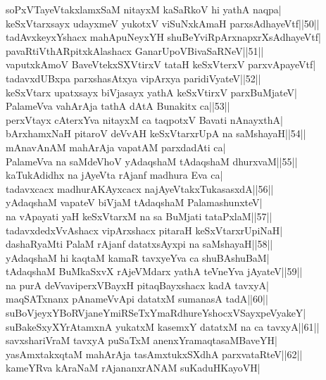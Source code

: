 \documentclass{article}
\begin{document}
soPxVTayeVtakxlamxSaM nitayxM kaSaRkoV hi yathA naqpa|\\
keSxVtarxsayx udayxmeV yukotxV viSuNxkAmaH parxsAdhayeVtf||50||\\
tadAvxkeyxYshacx mahApuNeyxYH shuBeYviRpArxnapxrXsAdhayeVtf|\\
pavaRtiVthARpitxkAlashacx GanarUpoVBivaSaRNeV||51||\\
vaputxkAmoV BaveVtekxSXVtirxV tataH keSxVterxV parxvApayeVtf|\\
tadavxdUBxpa parxshasAtxya vipArxya paridiVyateV||52||\\
keSxVtarx upatxsayx biVjasayx yathA keSxVtirxV parxBuMjateV|\\
PalameVva vahArAja tathA dAtA Bunakitx ca||53||\\
perxVtayx cAterxYva nitayxM ca taqpotxV Bavati nAnayxthA|\\
bArxhamxNaH pitaroV deVvAH keSxVtarxrUpA na saMshayaH||54||\\
mAnavAnAM mahArAja vapatAM parxdadAti ca|\\
PalameVva na saMdeVhoV yAdaqshaM tAdaqshaM dhurxvaM||55||\\
kaTukAdidhx na jAyeVta rAjanf madhura Eva ca|\\
tadavxcacx madhurAKAyxcacx najAyeVtakxTukasasxdA||56||\\
yAdaqshaM vapateV biVjaM tAdaqshaM PalamashunxteV|\\
na vApayati yaH keSxVtarxM na sa BuMjati tataPxlaM||57||\\
tadavxdedxVvAshacx vipArxshacx pitaraH keSxVtarxrUpiNaH|\\
dashaRyaMti PalaM rAjanf datatxsAyxpi na saMshayaH||58||\\
yAdaqshaM hi kaqtaM kamaR tavxyeYva ca shuBAshuBaM|\\
tAdaqshaM BuMkaSxvX rAjeVMdarx yathA teVneYva jAyateV||59||\\
na purA deVvaviperxVBayxH pitaqBayxshacx kadA tavxyA|\\
maqSATxnanx pAnameVvApi datatxM sumanasA tadA||60||\\
suBoVjeyxYBoRVjaneYmiRSeTxYmaRdhureYshocxVSayxpeVyakeY|\\
suBakeSxyXYrAtamxnA yukatxM kasemxY datatxM na ca tavxyA||61||\\
savxshariVraM tavxyA puSaTxM anenxYramaqtasaMBaveYH|\\
yasAmxtakxqtaM mahArAja tasAmxtukxSXdhA parxvataRteV||62||\\
kameYRva kAraNaM rAjananxrANAM suKaduHKayoVH|\\
\end{document}
